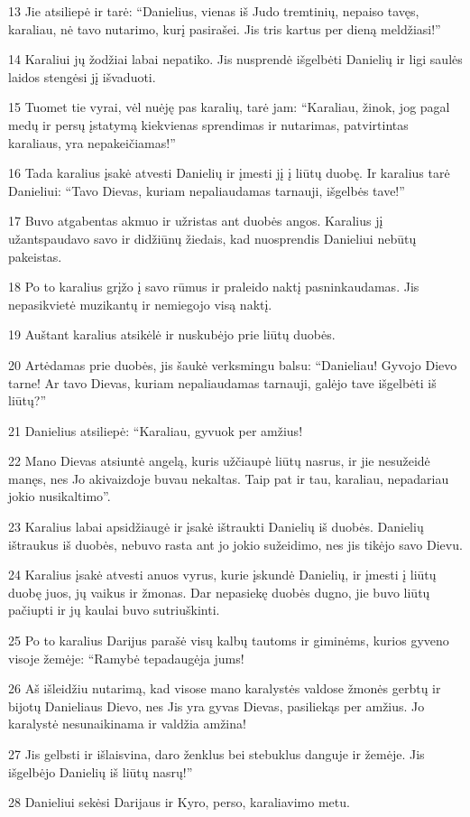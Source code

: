 \par 13 Jie atsiliepė ir tarė: “Danielius, vienas iš Judo tremtinių, nepaiso tavęs, karaliau, nė tavo nutarimo, kurį pasirašei. Jis tris kartus per dieną meldžiasi!” 
\par 14 Karaliui jų žodžiai labai nepatiko. Jis nusprendė išgelbėti Danielių ir ligi saulės laidos stengėsi jį išvaduoti. 
\par 15 Tuomet tie vyrai, vėl nuėję pas karalių, tarė jam: “Karaliau, žinok, jog pagal medų ir persų įstatymą kiekvienas sprendimas ir nutarimas, patvirtintas karaliaus, yra nepakeičiamas!” 
\par 16 Tada karalius įsakė atvesti Danielių ir įmesti jį į liūtų duobę. Ir karalius tarė Danieliui: “Tavo Dievas, kuriam nepaliaudamas tarnauji, išgelbės tave!” 
\par 17 Buvo atgabentas akmuo ir užristas ant duobės angos. Karalius jį užantspaudavo savo ir didžiūnų žiedais, kad nuosprendis Danieliui nebūtų pakeistas. 
\par 18 Po to karalius grįžo į savo rūmus ir praleido naktį pasninkaudamas. Jis nepasikvietė muzikantų ir nemiegojo visą naktį. 
\par 19 Auštant karalius atsikėlė ir nuskubėjo prie liūtų duobės. 
\par 20 Artėdamas prie duobės, jis šaukė verksmingu balsu: “Danieliau! Gyvojo Dievo tarne! Ar tavo Dievas, kuriam nepaliaudamas tarnauji, galėjo tave išgelbėti iš liūtų?” 
\par 21 Danielius atsiliepė: “Karaliau, gyvuok per amžius! 
\par 22 Mano Dievas atsiuntė angelą, kuris užčiaupė liūtų nasrus, ir jie nesužeidė manęs, nes Jo akivaizdoje buvau nekaltas. Taip pat ir tau, karaliau, nepadariau jokio nusikaltimo”. 
\par 23 Karalius labai apsidžiaugė ir įsakė ištraukti Danielių iš duobės. Danielių ištraukus iš duobės, nebuvo rasta ant jo jokio sužeidimo, nes jis tikėjo savo Dievu. 
\par 24 Karalius įsakė atvesti anuos vyrus, kurie įskundė Danielių, ir įmesti į liūtų duobę juos, jų vaikus ir žmonas. Dar nepasiekę duobės dugno, jie buvo liūtų pačiupti ir jų kaulai buvo sutriuškinti. 
\par 25 Po to karalius Darijus parašė visų kalbų tautoms ir giminėms, kurios gyveno visoje žemėje: “Ramybė tepadaugėja jums! 
\par 26 Aš išleidžiu nutarimą, kad visose mano karalystės valdose žmonės gerbtų ir bijotų Danieliaus Dievo, nes Jis yra gyvas Dievas, pasiliekąs per amžius. Jo karalystė nesunaikinama ir valdžia amžina! 
\par 27 Jis gelbsti ir išlaisvina, daro ženklus bei stebuklus danguje ir žemėje. Jis išgelbėjo Danielių iš liūtų nasrų!” 
\par 28 Danieliui sekėsi Darijaus ir Kyro, perso, karaliavimo metu.



